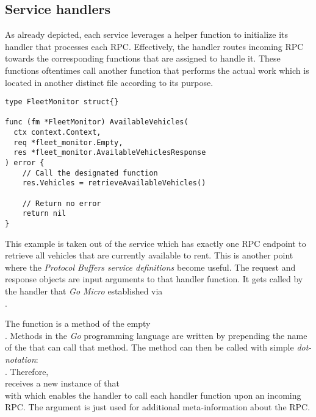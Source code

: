 \documentclass[12pt,a4paper,twoside]{report}
\begin{document}
\subsection{Service handlers} \label{subsect:service-handlers}

As already depicted, each service leverages a helper function to initialize
its handler that processes each RPC. Effectively, the handler routes incoming
RPC towards the corresponding functions that are assigned to handle it.
These functions oftentimes call another function that performs the actual work
which is located in another distinct file according to its purpose.

\begin{lstlisting}[title=services/fleet-monitor/main.go]
type FleetMonitor struct{}

func (fm *FleetMonitor) AvailableVehicles(
  ctx context.Context,
  req *fleet_monitor.Empty,
  res *fleet_monitor.AvailableVehiclesResponse
) error {
    // Call the designated function
	res.Vehicles = retrieveAvailableVehicles()

    // Return no error
	return nil
}
\end{lstlisting}

This example is taken out of the  service which has
exactly one RPC endpoint to retrieve all vehicles that are currently available
to rent. This is another point where the \textit{Protocol Buffers service definitions}
become useful. The request and response objects are input arguments to that
handler function. It gets called by the handler that \textit{Go Micro} established via\\
.

The function  is a method of the empty\\
 . Methods in the \textit{Go} programming
language are written by prepending the name of the  that can
call that method. The method can then be called with simple \textit{dot-notation}:\\
.
Therefore, \\ receives a new instance of that\\
  with  which enables
the handler to call each handler function upon an incoming RPC.
The  argument is just used for additional meta-information about the RPC.
\end{document}
